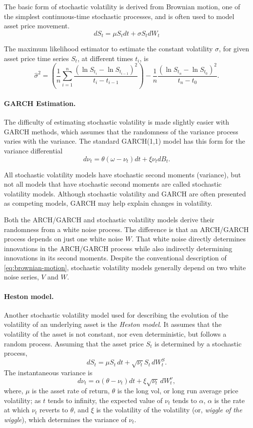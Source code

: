 The basic form of stochastic volatility is derived from Brownian motion, one of the simplest continuous-time stochastic processes, and is often used to model asset price movement.
\begin{equation}
dS_t = \mu S_t dt + \sigma S_t dW_t
\label{eq:brownian-motion}
\end{equation}

The maximum likelihood estimator to estimate the constant volatility $\sigma$, for given asset price time series $S_t$, at different times $t_i$, is 
\[
\hat{\sigma}^2= \left(\frac{1}{n} \sum_{i=1}^n \frac{(\ln S_{t_i}- \ln S_{t_{i-1}})^2}{t_i-t_{i-1}} \right) - \frac{1}{n} \frac{(\ln S_{t_n}- \ln S_{t_0})^2}{t_n-t_0}.
\]

\paragraph{GARCH Estimation.} The difficulty of estimating stochastic volatility is made slightly easier with GARCH methods, which assumes that the randomness of the variance process varies with the variance. The standard GARCH(1,1) model has this form for the variance differential
\[
d \nu_t = \theta(\omega - \nu_t )dt + \xi \nu_t dB_t .
\]

All stochastic volatility models have stochastic second moments (variance), but not all models that have stochastic second moments are called stochastic volatility models. Although stochastic volatility and GARCH are often presented as competing models, GARCH may help explain changes in volatility.

Both the ARCH/GARCH and stochastic volatility models derive their randomness 
from a white noise process. The difference is that an ARCH/GARCH process depends 
on just one white noise $W$. That white noise directly determines innovations in the ARCH/GARCH process while also indirectly determining innovations in its second moments. Despite the conventional description of \eqref{eq:brownian-motion}, stochastic volatility models generally depend on two white noise series, $V$ and $W$.

\paragraph{Heston model.} Another stochastic volatility model used for describing the evolution of the volatility of an underlying asset is the \emph{Heston model}. It assumes that the volatility of the asset is not constant, nor even deterministic, but follows a random process. Assuming that the asset price $S_t$ is determined by a stochastic process,
\[
dS_t = \mu S_t\,dt + \sqrt{\nu_t} S_t\,dW^S_t.
\]
The instantaneous variance is
\[
d\nu_t = \alpha(\theta - \nu_t)dt + \xi \sqrt{\nu_t}\,dW^{\nu}_t,
\]
where,
$\mu$ is the asset rate of return, $\theta$ is the long vol, or long run average price volatility; as $t$ tends to infinity, the expected value of $\nu_t$ tends to $\alpha$, $\alpha$ is the rate at which $\nu_t$ reverts to $\theta$, and $\xi$ is the volatility of the volatility (or, \emph{wiggle of the wiggle}), which determines the variance of $\nu_t$.
